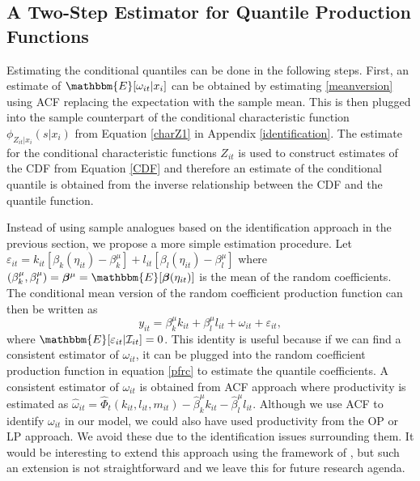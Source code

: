 \documentclass[12pt]{article}
\begin{document}
\subsection{A Two-Step Estimator for Quantile Production Functions} \label{2step}
Estimating the conditional quantiles can be done in the following steps. First, an estimate of $\mathbbm{E}[\omega_{it}|x_{i}]$ can be obtained by estimating \eqref{meanversion} using ACF replacing the expectation with the sample mean. This is then plugged into the sample counterpart of the conditional characteristic function $\phi_{Z_{it}|x_{i}}(s|x_{i})$ from Equation \eqref{charZ1} in Appendix \ref{identification}. The estimate for the conditional characteristic functions $Z_{it}$ is used to construct estimates of the CDF from Equation \eqref{CDF} and therefore an estimate of the conditional quantile is obtained from the inverse relationship between the CDF and the quantile function.

Instead of using sample analogues based on the identification approach in the previous section, we propose a more simple estimation procedure. Let $\varepsilon_{it}=k_{it}[\beta_{k}(\eta_{it})-\beta^{\mu}_{k}]+l_{it}[\beta_{l}(\eta_{it})-\beta^{\mu}_{l}]$ where $(\beta_{k}^{\mu}, \beta_{l}^{\mu})=\boldsymbol{\beta}^{\mu}=\mathbbm{E}[\boldsymbol{\beta}(\eta_{it})]$ is the mean of the random coefficients. The conditional mean version of the random coefficient production function can then be written as
\begin{equation}
y_{it}=\beta_{k}^{\mu}k_{it}+\beta_{l}^{\mu}l_{it}+\omega_{it}+\varepsilon_{it},
\end{equation}
where $\mathbbm{E}[\varepsilon_{it}|\mathcal{I}_{it}]=0$. This identity is useful because if we can find a consistent estimator of $\omega_{it}$, it can be plugged into the random coefficient production function in equation \eqref{pfrc} to estimate the quantile coefficients. A consistent estimator of $\omega_{it}$ is obtained from ACF approach where productivity is estimated as $\hat{\omega}_{it}=\hat{\Phi}_{t}(k_{it}, l_{it}, m_{it})-\hat{\beta}^{\mu}_{k}k_{it}-\hat{\beta}^{\mu}_{l}l_{it}$. Although we use ACF to identify $\omega_{it}$ in our model, we could also have used productivity from the OP or LP approach. We avoid these due to the identification issues surrounding them. It would be interesting to extend this approach using the framework of \cite{Gandhi2020}, but such an extension is not straightforward and we leave this for future research agenda.
\end{document}
